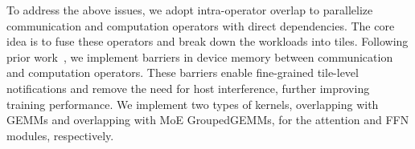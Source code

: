 To address the above issues, we adopt intra-operator overlap to parallelize communication and computation operators with direct dependencies. The core idea is to fuse these operators and break down the workloads into tiles.
Following prior work~\cite{jangda2022breaking, chang2024flux, zhang2025comet, zheng2025tilelink}, we implement barriers in device memory between communication and computation operators. 
These barriers enable fine-grained tile-level notifications and remove the need for host interference, further improving training performance.
We implement two types of kernels, overlapping with GEMMs and overlapping with MoE GroupedGEMMs, for the attention and FFN modules, respectively.



